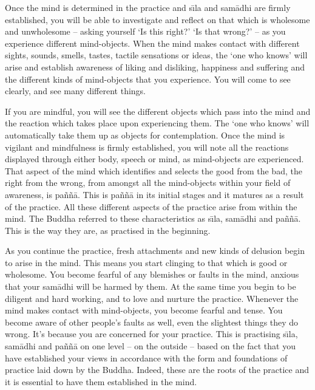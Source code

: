 Once the mind is determined in the practice and s\={\i}la and sam\=adhi are firmly established, you will be able to investigate and reflect on that which is wholesome and unwholesome -- asking yourself `Is this right?' `Is that wrong?' -- as you experience different mind-objects. When the mind makes contact with different sights, sounds, smells, tastes, tactile sensations or ideas, the `one who knows' will arise and establish awareness of liking and disliking, happiness and suffering and the different kinds of mind-objects that you experience. You will come to see clearly, and see many different things.

If you are mindful, you will see the different objects which pass into the mind and the reaction which takes place upon experiencing them. The `one who knows' will automatically take them up as objects for contemplation. Once the mind is vigilant and mindfulness is firmly established, you will note all the reactions displayed through either body, speech or mind, as mind-objects are experienced. That aspect of the mind which identifies and selects the good from the bad, the right from the wrong, from amongst all the mind-objects within your field of awareness, is pa\~n\~n\=a. This is pa\~n\~n\=a in its initial stages and it matures as a result of the practice. All these different aspects of the practice arise from within the mind. The Buddha referred to these characteristics as s\={\i}la, sam\=adhi and pa\~n\~n\=a. This is the way they are, as practised in the beginning.

As you continue the practice, fresh attachments and new kinds of delusion begin to arise in the mind. This means you start clinging to that which is good or wholesome. You become fearful of any blemishes or faults in the mind, anxious that your sam\=adhi will be harmed by them. At the same time you begin to be diligent and hard working, and to love and nurture the practice. Whenever the mind makes contact with mind-objects, you become fearful and tense. You become aware of other people's faults as well, even the slightest things they do wrong. It's because you are concerned for your practice. This is practising s\={\i}la, sam\=adhi and pa\~n\~n\=a on one level -- on the outside -- based on the fact that you have established your views in accordance with the form and foundations of practice laid down by the Buddha. Indeed, these are the roots of the practice and it is essential to have them established in the mind.

